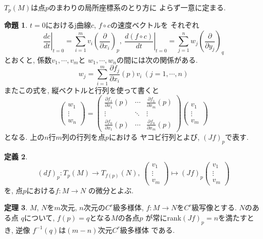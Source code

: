 \documentclass[twocolumn]{jarticle}
\theoremstyle{definition}
\newtheorem{theorem}{定理}[section]
\newtheorem{definition}[theorem]{定義}
\newtheorem{proposition}[theorem]{命題}
\begin{document}
$T_p(M)$は点$p$のまわりの局所座標系のとり方に
よらず一意に定まる. 
\begin{proposition}\label{prop:relation of v and w}
  $t=0$におけるj曲線$c$, $f\circ c$の速度ベクトルを
  それぞれ
  $$\left .\frac{dc}{dt}\right|_{t=0}=
  \sum_{i=1}^{m}v_i\left(\frac{\partial}
  {\partial x_i}\right)_p,\ 
  \left .\frac{d(f\circ c)}{dt}\right|_{t=0}=
  \sum_{j=1}^{n}w_j\left(\frac{\partial}
  {\partial y_j}\right)_q$$
  とおくと, 係数$v_1,\cdots ,v_m$と
  $w_1,\cdots ,w_n$の間には次の関係がある. 
  $$w_j=\sum_{i=1}^{m}\frac{\partial f_j}
  {\partial x_i}(p)v_i\ (j=1,\cdots ,n)$$
  またこの式を, 縦ベクトルと行列を使って書くと
  $$\begin{pmatrix}
        w_1 \\
        \vdots \\
        w_n 
      \end{pmatrix}
      =
      \left(
      \begin{array}{ccc}
        \frac{\partial f_1}{\partial x_1}(p)&\cdots &\frac{\partial f_1}{\partial x_m}(p)\\
        \vdots &\ddots& \vdots \\
        \frac{\partial f_n}{\partial x_1}(p)&\cdots &\frac{\partial f_n}{\partial x_m}(p) 
      \end{array} 
      \right)
      \begin{pmatrix}
        v_1\\
        \vdots \\
        v_m
      \end{pmatrix}
      $$
  となる. 上の$n$行$m$列の行列を点$p$における
  ヤコビ行列とよび, $(Jf)_p$で表す. 
\end{proposition}
\begin{definition}\label{def:differential}
  $$(df)_p:T_p(M)\to T_{f(p)}(N),\ 
  \begin{pmatrix}
    v_1\\
    \vdots \\
    v_m
  \end{pmatrix}
  \mapsto
  (Jf)_p
  \begin{pmatrix}
    v_1\\
    \vdots \\
    v_m
  \end{pmatrix}$$
  を, 点$p$における$f:M\to N$
  の微分とよぶ. 
\end{definition}
\begin{theorem}\label{theo:f^{-1}(q) C^r manifold}
  $M$, $N$を$m$次元, $n$次元の$C^r$級多様体, 
  $f:M\to N$を$C^r$級写像とする. $N$のある点
  $q$について, $f(p)=q$となる$M$の各点$p$
  が常にrank$(Jf)_p=n$を満たすとき, 逆像
  $f^{-1}(q)$は$(m-n)$次元$C^r$級多様体
  である. 
\end{theorem}
\end{document}
